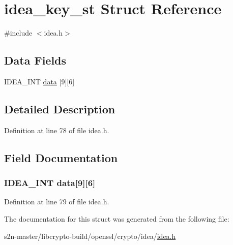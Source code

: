 \hypertarget{structidea__key__st}{}\section{idea\+\_\+key\+\_\+st Struct Reference}
\label{structidea__key__st}


{\ttfamily \#include $<$idea.\+h$>$}

\subsection*{Data Fields}
\begin{DoxyCompactItemize}
\item 
I\+D\+E\+A\+\_\+\+I\+NT \hyperlink{structidea__key__st_ab1e6e17a72b0b13af028c269cff43c6c}{data} \mbox{[}9\mbox{]}\mbox{[}6\mbox{]}
\end{DoxyCompactItemize}


\subsection{Detailed Description}


Definition at line 78 of file idea.\+h.



\subsection{Field Documentation}
\subsubsection[{\texorpdfstring{data}{data}}]{\setlength{\rightskip}{0pt plus 5cm}I\+D\+E\+A\+\_\+\+I\+NT data\mbox{[}9\mbox{]}\mbox{[}6\mbox{]}}\hypertarget{structidea__key__st_ab1e6e17a72b0b13af028c269cff43c6c}{}\label{structidea__key__st_ab1e6e17a72b0b13af028c269cff43c6c}


Definition at line 79 of file idea.\+h.



The documentation for this struct was generated from the following file\+:\begin{DoxyCompactItemize}
\item 
s2n-\/master/libcrypto-\/build/openssl/crypto/idea/\hyperlink{idea_8h}{idea.\+h}\end{DoxyCompactItemize}
